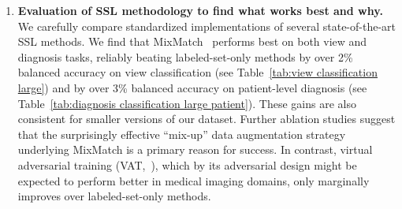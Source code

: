 \begin{enumerate}[leftmargin=0cm,itemindent=.4cm,labelwidth=\itemindent,labelsep=0cm,align=left]
	\item 
	\textbf{Evaluation of SSL methodology to find what works best and why.} We carefully compare standardized implementations of several state-of-the-art SSL methods. We find that MixMatch~\citep{berthelotMixmatchHolisticApproach2019} performs best on both view and diagnosis tasks, reliably beating labeled-set-only methods by over 2\% balanced accuracy on view classification (see Table~\ref{tab:view classification large}) and by over 3\% balanced accuracy on patient-level diagnosis (see Table~\ref{tab:diagnosis classification large patient}). These gains are also consistent for smaller versions of our dataset.
	  	Further ablation studies suggest that the surprisingly effective ``mix-up'' data augmentation strategy underlying MixMatch is a primary reason for success.
	  	In contrast, virtual adversarial training (VAT,~\citet{miyatoVirtualAdversarialTraining2019}), which by its adversarial design might be expected to perform better in medical imaging domains, only marginally improves over labeled-set-only methods.
	  

\end{enumerate}
